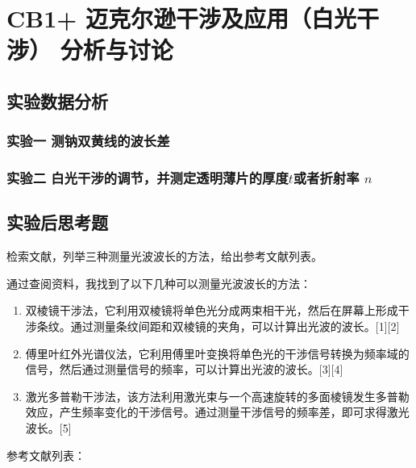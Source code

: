 \documentclass[dvipsnames, svgnames,a4paper,11pt]{article}
\begin{document}
\section{CB1+ \quad 迈克尔逊干涉及应用（白光干涉） \quad\heiti 分析与讨论}

\subsection{实验数据分析}

	\subsubsection{实验一 测钠双黄线的波长差}
		
		
		
		
		
	\subsubsection{实验二 白光干涉的调节，并测定透明薄片的厚度$t$或者折射率 $n$}
			
			
			
			
\subsection{实验后思考题}



\begin{question}
	检索文献，列举三种测量光波波长的方法，给出参考文献列表。%
\end{question}
	
	通过查阅资料，我找到了以下几种可以测量光波波长的方法：
	
\begin{enumerate}
	
	\item 	双棱镜干涉法，它利用双棱镜将单色光分成两束相干光，然后在屏幕上形成干涉条纹。通过测量条纹间距和双棱镜的夹角，可以计算出光波的波长。[1][2]
	\item 	傅里叶红外光谱仪法，它利用傅里叶变换将单色光的干涉信号转换为频率域的信号，然后通过测量信号的频率，可以计算出光波的波长。[3][4]
	\item 	激光多普勒干涉法，该方法利用激光束与一个高速旋转的多面棱镜发生多普勒效应，产生频率变化的干涉信号。通过测量干涉信号的频率差，即可求得激光波长。[5]
\end{enumerate}
	
参考文献列表：

\end{document}
